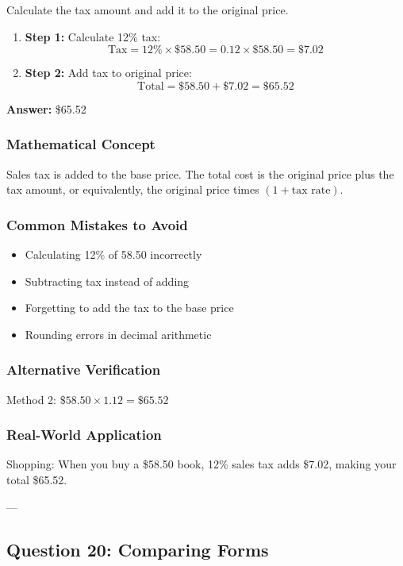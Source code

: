 \documentclass[12pt]{article}
\begin{document}
Calculate the tax amount and add it to the original price.

\begin{enumerate}
\item \textbf{Step 1:} Calculate 12\% tax:
  \[
  \text{Tax} = 12\% \times \$58.50 = 0.12 \times \$58.50 = \$7.02
  \]
\item \textbf{Step 2:} Add tax to original price:
  \[
  \text{Total} = \$58.50 + \$7.02 = \$65.52
  \]
\end{enumerate}

\textbf{Answer: } \$65.52

\subsubsection*{Mathematical Concept}
Sales tax is added to the base price. The total cost is the original price plus the tax amount, or equivalently, the original price times $(1 + \text{tax rate})$.

\subsubsection*{Common Mistakes to Avoid}
\begin{itemize}
\item Calculating 12\% of 58.50 incorrectly
\item Subtracting tax instead of adding
\item Forgetting to add the tax to the base price
\item Rounding errors in decimal arithmetic
\end{itemize}

\subsubsection*{Alternative Verification}
Method 2: $\$58.50 \times 1.12 = \$65.52$ 

\subsubsection*{Real-World Application}
Shopping: When you buy a \$58.50 book, 12\% sales tax adds \$7.02, making your total \$65.52.

---

\subsection{Question 20: Comparing Forms}
\end{document}
